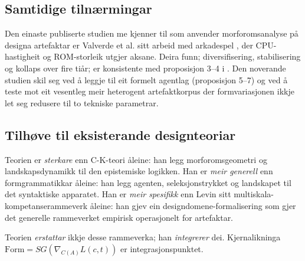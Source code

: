 \subsection{Samtidige tilnærmingar}

Den einaste publiserte studien me kjenner til som anvender morforomsanalyse på designa artefaktar er Valverde et al. sitt arbeid med arkadespel \parencite{Valverde2025}, der CPU-hastigheit og ROM-storleik utgjer aksane. Deira funn; diversifisering, stabilisering og kollaps over fire tiår; er konsistente med proposisjon 3--4 i \formlaere{}. Den noverande studien skil seg ved å leggje til eit formelt agentlag (proposisjon 5--7) og ved å teste mot eit vesentleg meir heterogent artefaktkorpus der formvariasjonen ikkje let seg redusere til to tekniske parametrar.

\subsection{Tilhøve til eksisterande designteoriar}

Teorien er \textit{sterkare} enn C-K-teori åleine: han legg morforomsgeometri og landskapsdynamikk til den epistemiske logikken. Han er \textit{meir generell} enn formgrammatikkar åleine: han legg agenten, seleksjonstrykket og landskapet til det syntaktiske apparatet. Han er \textit{meir spesifikk} enn Levin sitt multiskala-kompetanserammeverk åleine: han gjev ein designdomene-formalisering som gjer det generelle rammeverket empirisk operasjonelt for artefaktar.

Teorien \textit{erstattar} ikkje desse rammeverka; han \textit{integrerer} dei. Kjernalikninga $\mathrm{Form} = SG(\nabla_{C(A)} L(c,t))$ er integrasjonspunktet.
